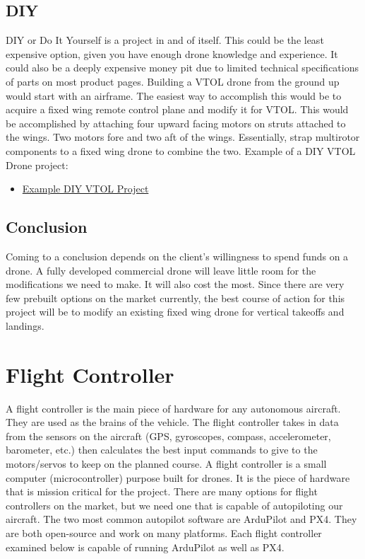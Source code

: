 \documentclass[onecolumn, 10pt, compsoc]{IEEEtran}
\begin{document}
\subsection{DIY}
DIY or Do It Yourself is a project in and of itself. This could be the least expensive option, given you have enough drone knowledge and experience. It could also be a deeply expensive money pit due to limited technical specifications of parts on most product pages. Building a VTOL drone from the ground up would start with an airframe. The easiest way to accomplish this would be to acquire a fixed wing remote control plane and modify it for VTOL. This would be accomplished by attaching four upward facing motors on struts attached to the wings. Two motors fore and two aft of the wings. Essentially, strap multirotor components to a fixed wing drone to combine the two. Example of a DIY VTOL Drone project: 
\begin{itemize}
    \item \href{https://www.instructables.com/id/Quadplane-Hybrid-Drone/}{Example DIY VTOL Project}
\end{itemize}
\subsection{Conclusion}
Coming to a conclusion depends on the client's willingness to spend funds on a drone. A fully developed commercial drone will leave little room for the modifications we need to make. It will also cost the most. Since there are very few prebuilt options on the market currently, the best course of action for this project will be to modify an existing fixed wing drone for vertical takeoffs and landings.


\section{Flight Controller}
A flight controller is the main piece of hardware for any autonomous aircraft. They are used as the brains of the vehicle. The flight controller takes in data from the sensors on the aircraft (GPS, gyroscopes, compass, accelerometer, barometer, etc.) then calculates the best input commands to give to the motors/servos to keep on the planned course. A flight controller is a small computer (microcontroller) purpose built for drones. It is the piece of hardware that is mission critical for the project. There are many options for flight controllers on the market, but we need one that is capable of autopiloting our aircraft. The two most common autopilot software are ArduPilot and PX4. They are both open-source and work on many platforms. Each flight controller examined below is capable of running ArduPilot as well as PX4. 
\end{document}
